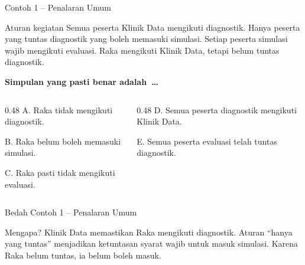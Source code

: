 \begin{frame}[shrink=10]{Contoh 1 -- Penalaran Umum}
  \begin{block}{Aturan kegiatan}
    Semua peserta Klinik Data mengikuti diagnostik. Hanya peserta yang tuntas diagnostik yang boleh memasuki simulasi. Setiap peserta simulasi wajib mengikuti evaluasi. Raka mengikuti Klinik Data, tetapi belum tuntas diagnostik.
  \end{block}
  {\bfseries Simpulan yang pasti benar adalah~\ldots}
  \vspace{0.10cm}
  {\fontsize{10.1}{12.5}\selectfont
  \begin{columns}[T,onlytextwidth]
    \begin{column}{0.48\textwidth}
      A. Raka tidak mengikuti diagnostik.\par\vspace{0.08cm}
      B. Raka belum boleh memasuki simulasi.\par\vspace{0.08cm}
      C. Raka pasti tidak mengikuti evaluasi.
    \end{column}
    \begin{column}{0.48\textwidth}
      D. Semua peserta diagnostik mengikuti Klinik Data.\par\vspace{0.08cm}
      E. Semua peserta evaluasi telah tuntas diagnostik.
    \end{column}
  \end{columns}}
\end{frame}

\begin{frame}{Bedah Contoh 1 -- Penalaran Umum}
  \vspace{0.22cm}
  \begin{block}{Mengapa?}
    Klinik Data memastikan Raka mengikuti diagnostik. Aturan ``hanya yang tuntas'' menjadikan ketuntasan syarat wajib untuk masuk simulasi. Karena Raka belum tuntas, ia belum boleh masuk.
  \end{block}
  {\fontsize{10.6}{13.2}\selectfont
  \par\vspace{0.16cm}
  }
\end{frame}

